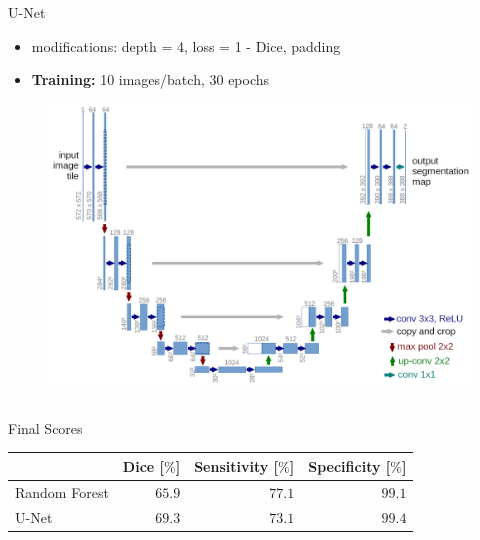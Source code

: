 \documentclass[final]{beamer}
\newlength{\onecolwid}
\newlength{\twocolwid}
\begin{document}
\begin{frame}[t]
\begin{columns}[t]
\begin{column}{\twocolwid}
\begin{columns}[t,totalwidth=\twocolwid]
\begin{column}{\onecolwid}
\begin{alertblock}{U-Net \cite{ronneberger2015u}}
\vspace*{12pt}
\begin{itemize}[label={}]
\item modifications: depth = 4, loss = 1 - Dice, padding
\item \textbf{Training:} 10 images/batch, 30 epochs
\end{itemize}
\begin{figure}
\centering
\includegraphics[width=0.9\linewidth]{u_net}
\end{figure}
\end{alertblock}

\end{column} %

\end{columns} %

\begin{alertblock}{Final Scores}
\centering
	\begin{tabular}{lrrr}
	\toprule
	 & Dice [$\%$] & Sensitivity [$\si{\%}$] & Specificity [$\%$] \\
	\midrule
	Random Forest & $\si{65.9}$ & $\si{77.1}$ & $\si{99.1}$ \\
	U-Net & $\si{69.3}$ & $\si{73.1}$ & $\si{99.4}$ \\
	\bottomrule
	\end{tabular}
\end{alertblock}


\end{column}
\end{columns}
\end{frame}
\end{document}
